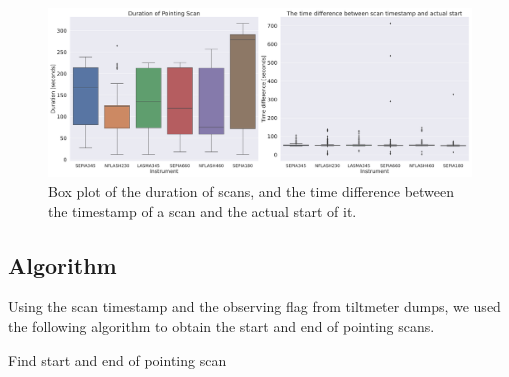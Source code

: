 \begin{figure}[H]
    \centering
    \includegraphics[width=1.1\textwidth]{Tiltmeter plots/scan_duration_distribution_rx.pdf}
    \caption{Box plot of the duration of scans, and the time difference between the timestamp of a scan and the actual start of it.}
    \label{fig:scan_times_box}
\end{figure}


\subsection{Algorithm}
Using the scan timestamp and the observing flag from tiltmeter dumps, we used the following algorithm to obtain the start and end of pointing scans.

\begin{algorithm}[H]
    \caption{Find start and end of pointing scan}
    \label{alg:scan_times}
    \begin{algorithmic}
            \Else
            \EndIf
        \EndFor
        \\
                \EndIf
                \EndIf
            \EndFor
        \EndFor
    \end{algorithmic}
\end{algorithm} 


